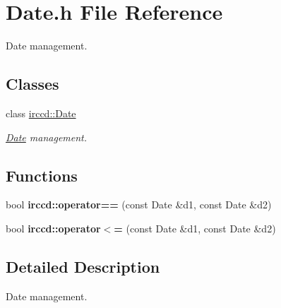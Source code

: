 \hypertarget{a00073}{\section{Date.\-h File Reference}
\label{a00073}
}


Date management.  


\subsection*{Classes}
\begin{DoxyCompactItemize}
\item 
class \hyperlink{a00023}{irccd\-::\-Date}
\begin{DoxyCompactList}\small\item\em \hyperlink{a00023}{Date} management. \end{DoxyCompactList}\end{DoxyCompactItemize}
\subsection*{Functions}
\begin{DoxyCompactItemize}
\item 
bool {\bfseries irccd\-::operator==} (const Date \&d1, const Date \&d2)
\item 
bool {\bfseries irccd\-::operator$<$=} (const Date \&d1, const Date \&d2)
\end{DoxyCompactItemize}


\subsection{Detailed Description}
Date management. 